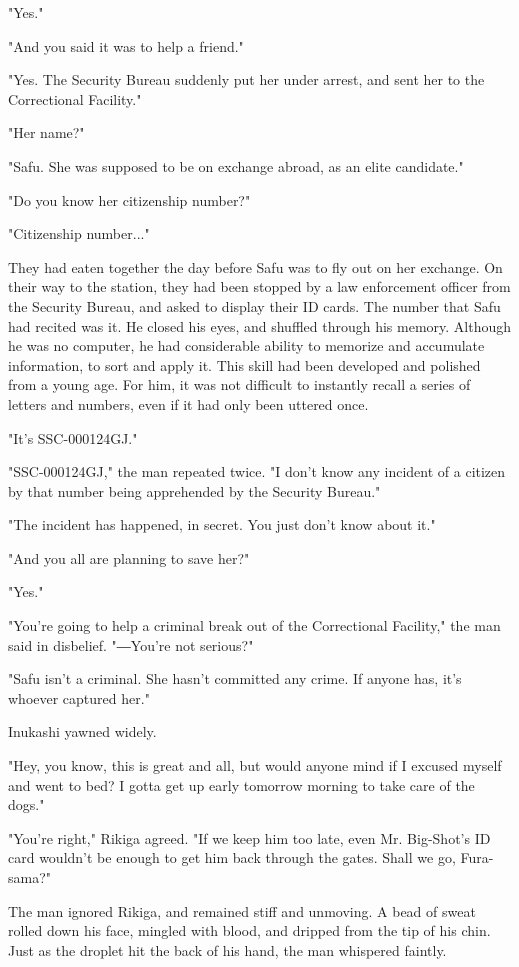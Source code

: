"Yes."

"And you said it was to help a friend."

"Yes. The Security Bureau suddenly put her under arrest, and sent her to
the Correctional Facility."

"Her name?"

"Safu. She was supposed to be on exchange abroad, as an elite
candidate."

"Do you know her citizenship number?"

"Citizenship number..."

They had eaten together the day before Safu was to fly out on her
exchange. On their way to the station, they had been stopped by a law
enforcement officer from the Security Bureau, and asked to display their
ID cards. The number that Safu had recited was it. He closed his eyes,
and shuffled through his memory. Although he was no computer, he had
considerable ability to memorize and accumulate information, to sort and
apply it. This skill had been developed and polished from a young age.
For him, it was not difficult to instantly recall a series of letters
and numbers, even if it had only been uttered once.

"It's SSC-000124GJ."

"SSC-000124GJ," the man repeated twice. "I don't know any incident of a
citizen by that number being apprehended by the Security Bureau."

"The incident has happened, in secret. You just don't know about it."

"And you all are planning to save her?"

"Yes."

"You're going to help a criminal break out of the Correctional
Facility," the man said in disbelief. "―You're not serious?"

"Safu isn't a criminal. She hasn't committed any crime. If anyone has,
it's whoever captured her."

Inukashi yawned widely.

"Hey, you know, this is great and all, but would anyone mind if I
excused myself and went to bed? I gotta get up early tomorrow morning to
take care of the dogs."

"You're right," Rikiga agreed. "If we keep him too late, even Mr.
Big-Shot's ID card wouldn't be enough to get him back through the gates.
Shall we go, Fura-sama?"

The man ignored Rikiga, and remained stiff and unmoving. A bead of sweat
rolled down his face, mingled with blood, and dripped from the tip of
his chin. Just as the droplet hit the back of his hand, the man
whispered faintly.

